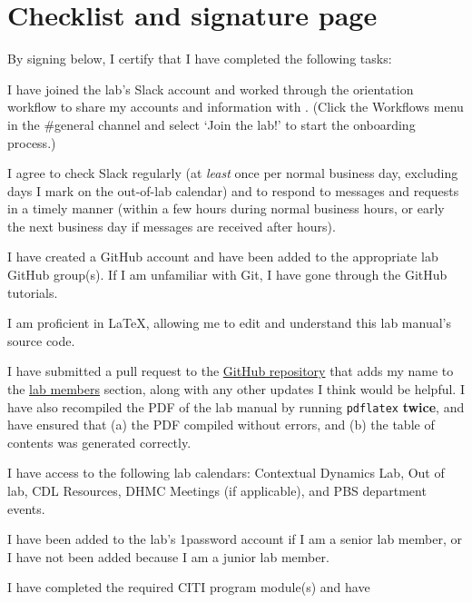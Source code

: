 \documentclass{tufte-book} %
\begin{document}
\begin{fullwidth}
\begin{multicols}{2}
\begin{list}{\quad}{}
\end{list}
\end{multicols}
\end{fullwidth}


\chapter{Checklist and signature page}

   By signing below, I certify that I have completed the following tasks:
   \begin{todolist}
     \item I have joined the lab's Slack account and worked through the
    orientation workflow to share my accounts and information with
    \director.  (Click the Workflows menu in
    the \#general channel and select `Join the lab!' to start the
    onboarding process.)
    \item I agree to check Slack
    regularly (at \textit{least} once per normal business day, excluding days I
    mark on the out-of-lab calendar) and to respond to messages and
    requests in a timely manner (within a few hours during normal
    business hours, or early the next business day if messages are
    received after hours).
  \item I have created a GitHub account and have been added to the appropriate lab
    GitHub group(s).  If I am unfamiliar with Git, I have gone through
    the GitHub tutorials.
  \item I am proficient in \LaTeX, allowing me to edit and understand
  this lab manual's source code.
\item I have submitted a pull request to the
  \href{https://github.com/ContextLab/lab-manual}{GitHub repository}
  that adds my name to the \hyperref[sec:curr_members]{lab members}
  section, along with any other updates I think would be helpful.  I
  have also recompiled the PDF of the lab manual by running
  \texttt{pdflatex} \textbf{twice}, and have ensured that (a) the PDF compiled
  without errors, and (b) the table of contents was generated correctly.
  \item I have access to the following lab calendars:
    Contextual Dynamics Lab, Out of lab, CDL Resources, DHMC Meetings (if
    applicable), and PBS department events.
  \item I have been added to the lab's 1password account if I am a
    senior lab member, or I have not been added because I am a junior
    lab member.
  \item I have completed the required CITI program module(s) and have

\end{todolist}
\end{document}
